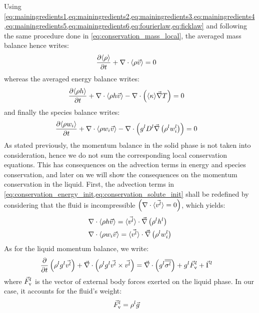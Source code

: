 Using \cref{eq:mainingredients1,eq:mainingredients2,eq:mainingredients3,eq:mainingredients4,eq:mainingredients5,eq:mainingredients6,eq:fourierlaw,eq:ficklaw}
and following the same procedure done in \cref{eq:conservation_mass_local}, the averaged mass balance hence writes:
\begin{align}
\label{eq:conservation_mass}
& \frac{\partial \langle \rho \rangle}{\partial t} + \nabla \cdot \langle \rho \vec{v} \rangle = 0
\end{align}
whereas the averaged energy balance writes:
\begin{align}
\label{eq:conservation_energy_init}
& \frac{\partial \langle \rho h \rangle}{\partial t} + \nabla \cdot \langle \rho h \vec{v} \rangle - \nabla \cdot \left( \langle \kappa \rangle \vec{\nabla} T \right) = 0
\end{align}
and finally the species balance writes:
\begin{align}
\label{eq:conservation_solute_init}
& \frac{\partial \langle \rho w_i \rangle}{\partial t} + \nabla \cdot \langle \rho w_i \vec{v} \rangle - \nabla \cdot \left( {g^l} D^l \vec{\nabla} \left( \rho^l w_i^l \right) \right)= 0
\end{align}
As stated previously, the momentum balance in the solid phase is not taken into consideration, hence we do not sum the corresponding 
local conservation equations. This has consequences on the advection terms in energy and species conservation, and later on we will show
the consequences on the momentum conservation in the liquid. First, the advection terms in \cref{eq:conservation_energy_init,eq:conservation_solute_init}
shall be redefined by considering that the fluid is incompressible $\left( \nabla \cdot \langle \vec{v^l} \rangle = 0 \right)$, which yields:
\begin{align}
\label{eq:advection_no_solid}
& \nabla \cdot \langle \rho h \vec{v} \rangle = \langle \vec{v^l} \rangle \cdot \vec{\nabla} \left( \rho^l h^l \right) \\
& \nabla \cdot \langle \rho w_i \vec{v} \rangle = \langle \vec{v^l} \rangle \cdot \vec{\nabla} \left( \rho^l w_i^l \right)
\end{align}
As for the liquid momentum balance, we write:
\begin{align}
\label{eq:conservation_momentumliq_init}
& \frac{\partial}{\partial t} \left(  \rho^l {g^l} \vec{v^l}  \right)  + \vec{\nabla} \cdot \left( \rho^l {g^l} \vec{v^l} \times \vec{v^l} \right) = 
	\vec{\nabla} \cdot \left( {g^l} {\overline{\overline{\sigma^l}}} \right) +{g^l} \vec{F}_{\text{v}}^l + \vec{\Gamma}^{l}
\end{align}
where $\vec{F}_{\text{v}}^l$ is the vector of external body forces exerted on the liquid phase. In our case, it accounts for the fluid's weight:
\begin{align}
\label{eq:fluid_weight}
& \vec{F}_{\text{v}}^l = \rho^l \vec{g}
\end{align}

